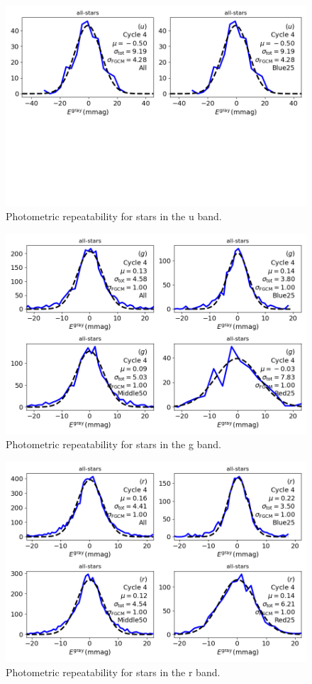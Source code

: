 \begin{figure}
  \includegraphics{photometric_calibration_figures/repeatability_u.png}
  \caption{Photometric repeatability for stars in the u band.}
\end{figure}

\begin{figure}
  \includegraphics{photometric_calibration_figures/repeatability_g.png}
  \caption{Photometric repeatability for stars in the g band.}
\end{figure}

\begin{figure}
  \includegraphics{photometric_calibration_figures/repeatability_r.png}
  \caption{Photometric repeatability for stars in the r band.}
\end{figure}

